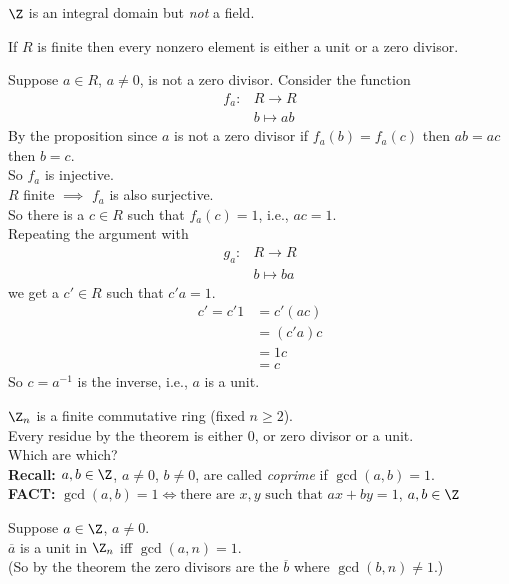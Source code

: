 \ex $\Z$ is an integral domain but \emph{not} a field.

\thm If $R$ is finite then every nonzero element is either a unit or a zero divisor.

\pf Suppose $a\in R$, $a\neq0$, is not a zero divisor.  Consider the function
\begin{align*}
f_a\colon & R\to R \\
& b \mapsto ab
\end{align*}
By the proposition since $a$ is not a zero divisor if $f_a(b)=f_a(c)$ then $ab=ac$ then $b=c$. \\
So $f_a$ is injective. \\
$R$ finite $\implies$ $f_a$ is also surjective. \\
So there is a $c\in R$ such that $f_a(c)=1$, i.e., $ac=1$. \\
Repeating the argument with
\begin{align*}
g_a\colon & R\to R \\
& b \mapsto ba
\end{align*}
we get a $c'\in R$ such that $c'a=1$.
\begin{align*}
c' = c'1 &= c'(ac) \\
&= (c'a)c \\
&= 1c \\
&= c
\end{align*}
So $c=a^{-1}$ is the inverse, i.e., $a$ is a unit.

$\Z_n$ is a finite commutative ring (fixed $n\geq2$). \\
Every residue by the theorem is either $0$, or zero divisor or a unit. \\
Which are which? \\
\textbf{Recall:} $a,b\in\Z$, $a\neq0$, $b\neq0$, are called \emph{coprime} if $\gcd(a,b)=1$. \\
\textbf{FACT:} $\gcd(a,b)=1\iff\text{there are $x,y$ such that $ax+by=1$}$, $a,b\in\Z$

\prop Suppose $a\in\Z$, $a\neq0$. \\
$\overline a$ is a unit in $\Z_n$ iff $\gcd(a,n)=1$. \\
(So by the theorem the zero divisors are the $\overline b$ where $\gcd(b,n)\neq1$.)

